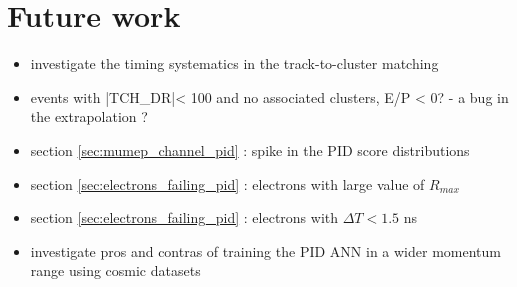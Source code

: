 

\section{Future work} 
\label{sec:to_be_investigated}

\begin{itemize}
\item 
  investigate the timing systematics in the track-to-cluster matching
\item 
  events with |TCH\_DR|< 100 and no associated clusters, E/P < 0? - a bug in the extrapolation ?
\item
  section \ref{sec:mumep_channel_pid} : spike in the PID score distributions
\item
  section \ref{sec:electrons_failing_pid} : electrons with large value of $R_{max}$
\item
  section \ref{sec:electrons_failing_pid} : electrons with $\Delta{T} < 1.5$ ns
\item
  investigate pros and contras of training the PID ANN in a wider momentum range using
  cosmic datasets
\end{itemize}
